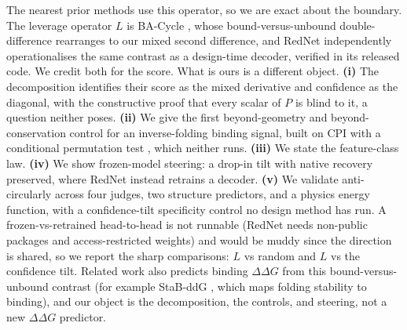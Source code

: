 \documentclass{article} %
\begin{document}
The nearest prior methods use this operator, so we are exact about the boundary. The leverage operator $L$ is
BA-Cycle \citep{jiao2024bacycle}, whose bound-versus-unbound double-difference rearranges to our mixed second
difference, and RedNet \citep{rednet2026} independently operationalises the same contrast as a design-time decoder,
verified in its released code. We credit both for the score. What is ours is a different object. \textbf{(i)} The
decomposition identifies their score as the mixed derivative and confidence as the diagonal, with the constructive
proof that every scalar of $P$ is blind to it, a question neither poses. \textbf{(ii)} We give the first
beyond-geometry and beyond-conservation control for an inverse-folding binding signal, built on CPI
\citep{watson2021cpi} with a conditional permutation test \citep{berrett2020cpt}, which neither runs. \textbf{(iii)}
We state the feature-class law. \textbf{(iv)} We show frozen-model steering: a drop-in tilt with native recovery
preserved, where RedNet instead retrains a decoder. \textbf{(v)} We validate anti-circularly across four judges,
two structure predictors, and a physics energy function, with a confidence-tilt specificity control no design
method has run. A frozen-vs-retrained head-to-head is not runnable (RedNet needs non-public packages and
access-restricted weights) and would be muddy since the direction is shared, so we report the sharp comparisons: $L$
vs random and $L$ vs the confidence tilt. Related work also predicts binding $\Delta\Delta G$ from this
bound-versus-unbound contrast (for example StaB-ddG \citep{deng2025stabddg}, which maps folding stability to
binding), and our object is the decomposition, the controls, and steering, not a new $\Delta\Delta G$ predictor.
\end{document}
